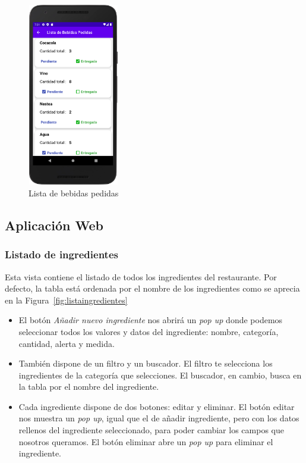 \begin{figure}[h]
    \centering
    \includegraphics[width=4cm, height=8cm]{Imagenes/Figuras/ListaBebidasPedidas.png}
   \caption{Lista de bebidas pedidas
    \label{fig:listaBebidasPedidas}}
\end{figure}


\subsection{Aplicación Web}

\subsubsection*{Listado de ingredientes}
Esta vista contiene el listado de todos los ingredientes del restaurante. Por defecto, la tabla está ordenada por el nombre de los ingredientes como se aprecia en la Figura~\ref{fig:listaingredientes}
\begin{itemize} 

\item El botón \textit{Añadir nuevo ingrediente} nos abrirá un \textit{pop up} donde podemos seleccionar todos los valores y datos del ingrediente: nombre, categoría, cantidad, alerta y medida. 

\item También dispone de un filtro y un buscador. El filtro te selecciona los ingredientes de la categoría que selecciones. El buscador, en cambio, busca en la tabla por el nombre del ingrediente.

\item Cada ingrediente dispone de dos botones: editar y eliminar. El botón editar nos muestra un \textit{pop up}, igual que el de añadir ingrediente, pero con los datos rellenos del ingrediente seleccionado, para poder cambiar los campos que nosotros queramos. El botón eliminar abre un \textit{pop up} para eliminar el ingrediente.


\end{itemize}


